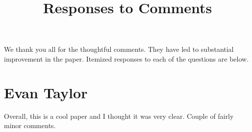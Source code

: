 

\usepackage[stable]{footmisc}

\newcommand*\leftright[2]{%
  \leavevmode
  \rlap{#1}%
  \hspace{0.5\linewidth}%
  #2}

\newcommand{\orth}{\ensuremath{\perp\!\!\!\perp}}%
\newcommand{\indep}{\orth}%
\newcommand{\notorth}{\ensuremath{\perp\!\!\!\!\!\!\diagup\!\!\!\!\!\!\perp}}%
\newcommand{\notindep}{\notorth}



\doublespacing



\singlespacing
\begin{titlepage}

\title{\Large \textbf{Responses to Comments}}

\maketitle
\thispagestyle{empty}
\restoregeometry
\end{titlepage}

\doublespacing

\noindent We thank you all for the thoughtful comments. They have led to substantial improvement in the paper. Itemized responses to each of the questions are below.

\section{Evan Taylor}

\noindent Overall, this is a cool paper and I thought it was very clear. Couple of fairly minor comments. 

